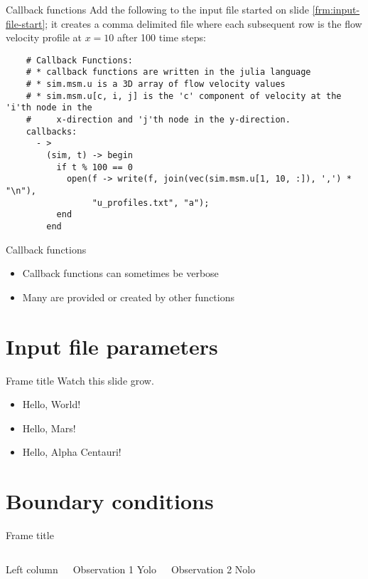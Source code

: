 \documentclass[pdf]{beamer}
\begin{document}
\begin{frame}[fragile]{Callback functions}
  Add the following to the input file started on slide \ref{frm:input-file-start}; it creates a comma delimited file where each subsequent row is the flow velocity profile at $x = 10$ after 100 time steps:
  \tiny
  \begin{verbatim}
    # Callback Functions:
    # * callback functions are written in the julia language
    # * sim.msm.u is a 3D array of flow velocity values
    # * sim.msm.u[c, i, j] is the 'c' component of velocity at the 'i'th node in the 
    #     x-direction and 'j'th node in the y-direction.
    callbacks:
      - >
        (sim, t) -> begin
          if t % 100 == 0
            open(f -> write(f, join(vec(sim.msm.u[1, 10, :]), ',') * "\n"), 
                 "u_profiles.txt", "a");
          end
        end
  \end{verbatim}
\end{frame}

\begin{frame}{Callback functions}
  \begin{itemize}
    \item Callback functions can sometimes be verbose
    \item Many are provided or created by other functions
  \end{itemize}
\end{frame}

\section{Input file parameters}

\begin{frame}{Frame title}
  Watch this slide grow.
  \pause
  \begin{itemize}
    \item Hello, World!
      \pause
    \item Hello, Mars!
      \pause
    \item Hello, Alpha Centauri!
  \end{itemize}
\end{frame}

\section{Boundary conditions}

\begin{frame}{Frame title}
  \begin{columns}
    Left column
    \begin{block}{Observation 1}
      Yolo
    \end{block}
    \begin{block}{Observation 2}
      Nolo
    \end{block}
  \end{columns}
\end{frame}
\end{document}
